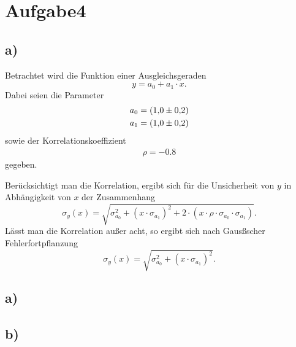 \newpage
\section{Aufgabe4}
\label{sec:a4}

\subsection{a)}
\label{subsec:a4a}
 Betrachtet wird die Funktion einer
 Ausgleichsgeraden
 \\
 \begin{equation}
   \label{eqn:f}
   y = a_{0} + a_{1} \cdot x.
 \end{equation}
 Dabei seien die Parameter
 \\
 \begin{align*}
   a_{0} &= \SI{1.0+-0.2}{}\\
   a_{1} &= \SI{1.0+-0.2}{}
 \end{align*}
 sowie der Korrelationskoeffizient
 \\
 \begin{align*}
   \rho = -0.8
 \end{align*}
gegeben.

Berücksichtigt man die Korrelation,
ergibt sich für die Unsicherheit von $y$
in Abhängigkeit von $x$ der Zusammenhang
\\
\begin{equation}
  \label{eqn:korr}
  \sigma_{y}(x) = \sqrt{\sigma_{a_{0}}^{2} + \left( x \cdot \sigma_{a_{1}} \right)^{2}
  + 2 \cdot \left( x \cdot \rho \cdot \sigma_{a_{0}} \cdot \sigma_{a_{1}} \right)}.
\end{equation}
Lässt man die Korrelation außer acht, so ergibt sich nach Gausßscher Fehlerfortpflanzung
\\
\begin{equation}
  \label{eqn:unkorr}
  \sigma_{y}(x) = \sqrt{\sigma_{a_{0}}^{2} + \left( x \cdot \sigma_{a_{1}} \right)^{2}}.
\end{equation}


\subsection{a)}
\label{subsec:a4a}

\subsection{b)}
\label{subsec:a4b}

